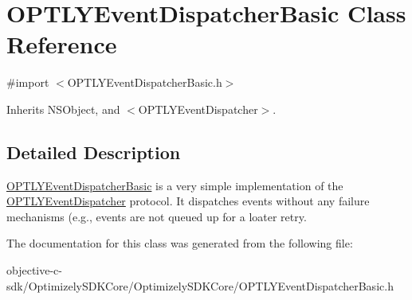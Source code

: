 \hypertarget{interface_o_p_t_l_y_event_dispatcher_basic}{}\section{O\+P\+T\+L\+Y\+Event\+Dispatcher\+Basic Class Reference}
\label{interface_o_p_t_l_y_event_dispatcher_basic}


{\ttfamily \#import $<$O\+P\+T\+L\+Y\+Event\+Dispatcher\+Basic.\+h$>$}



Inherits N\+S\+Object, and $<$\+O\+P\+T\+L\+Y\+Event\+Dispatcher$>$.



\subsection{Detailed Description}
\mbox{\hyperlink{interface_o_p_t_l_y_event_dispatcher_basic}{O\+P\+T\+L\+Y\+Event\+Dispatcher\+Basic}} is a very simple implementation of the \mbox{\hyperlink{class_o_p_t_l_y_event_dispatcher-p}{O\+P\+T\+L\+Y\+Event\+Dispatcher}} protocol. It dispatches events without any failure mechanisms (e.\+g., events are not queued up for a loater retry. 

The documentation for this class was generated from the following file\+:\begin{DoxyCompactItemize}
\item 
objective-\/c-\/sdk/\+Optimizely\+S\+D\+K\+Core/\+Optimizely\+S\+D\+K\+Core/O\+P\+T\+L\+Y\+Event\+Dispatcher\+Basic.\+h\end{DoxyCompactItemize}
